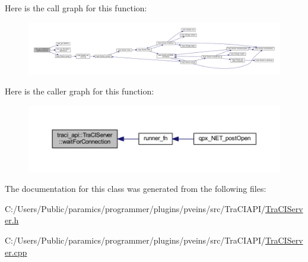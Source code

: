 Here is the call graph for this function\+:
\nopagebreak
\begin{figure}[H]
\begin{center}
\leavevmode
\includegraphics[width=350pt]{classtraci__api_1_1_tra_c_i_server_ac9cc474ec4ae6277c82cbf80f212852e_cgraph}
\end{center}
\end{figure}
Here is the caller graph for this function\+:
\nopagebreak
\begin{figure}[H]
\begin{center}
\leavevmode
\includegraphics[width=350pt]{classtraci__api_1_1_tra_c_i_server_ac9cc474ec4ae6277c82cbf80f212852e_icgraph}
\end{center}
\end{figure}


The documentation for this class was generated from the following files\+:\begin{DoxyCompactItemize}
\item 
C\+:/\+Users/\+Public/paramics/programmer/plugins/pveins/src/\+Tra\+C\+I\+A\+P\+I/\hyperlink{_tra_c_i_server_8h}{Tra\+C\+I\+Server.\+h}\item 
C\+:/\+Users/\+Public/paramics/programmer/plugins/pveins/src/\+Tra\+C\+I\+A\+P\+I/\hyperlink{_tra_c_i_server_8cpp}{Tra\+C\+I\+Server.\+cpp}\end{DoxyCompactItemize}
